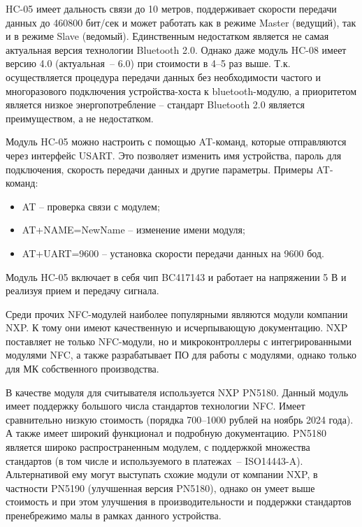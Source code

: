 HC-05 имеет дальность связи до 10 метров, поддерживает скорости передачи данных до 460800 бит/сек и может работать как в режиме Master (ведущий), так и в режиме Slave (ведомый).
Единственным недостатком является не самая актуальная версия технологии Bluetooth 2.0.
Однако даже модуль HC-08 имеет версию 4.0 (актуальная~-- 6.0) при стоимости в 4--5 раз выше.
Т.к. осуществляется процедура передачи данных без необходимости частого и многоразового подключения устройства-хоста к bluetooth-модулю, а приоритетом является низкое энергопотребление – стандарт Bluetooth 2.0 является преимуществом, а не недостатком.

Модуль HC-05 можно настроить с помощью AT-команд, которые отправляются через интерфейс USART.
Это позволяет изменить имя устройства, пароль для подключения, скорость передачи данных и другие параметры.
Примеры AT-команд:

\begin{itemize}
    \item AT – проверка связи с модулем;
    \item AT+NAME=NewName – изменение имени модуля;
    \item AT+UART=9600 – установка скорости передачи данных на 9600 бод.
\end{itemize}

Модуль HC-05 включает в себя чип BC417143 и работает на напряжении 5 В и реализуя прием и передачу сигнала.


Среди прочих NFC-модулей наиболее популярными являются модули компании NXP.
К тому они имеют качественную и исчерпывающую документацию.
NXP поставляет не только NFC-модули, но и микроконтроллеры с интегрированными модулями NFC, а также разрабатывает ПО для работы с модулями, однако только для МК собственного производства.

В качестве модуля для считывателя используется NXP PN5180.
Данный модуль имеет поддержку большого числа стандартов технологии NFC.
Имеет сравнительно низкую стоимость (порядка 700--1000 рублей на ноябрь 2024 года).
А также имеет широкий функционал и подробную документацию.
PN5180 является широко распространенным модулем, с поддержкой множества стандартов (в том числе и используемого в платежах~-- ISO14443-A).
Альтернативой ему могут выступать схожие модули от компании NXP, в частности PN5190 (улучшенная версия PN5180), однако он умеет выше стоимость и при этом улучшения в производительности и поддержки стандартов пренебрежимо малы в рамках данного устройства.

%

